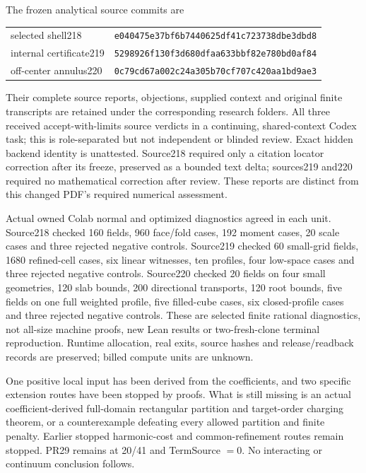 The frozen analytical source commits are
\begin{center}\scriptsize
\begin{tabular}{ll}
selected shell218 & \texttt{e040475e37bf6b7440625df41c723738dbe3dbd8}\\
internal certificate219 & \texttt{5298926f130f3d680dfaa633bbf82e780bd0af84}\\
off-center annulus220 & \texttt{0c79cd67a002c24a305b70cf707c420aa1bd9ae3}
\end{tabular}
\end{center}
Their complete source reports, objections, supplied context and original
finite transcripts are retained under the corresponding research folders.
All three received accept-with-limits source verdicts in a continuing,
shared-context Codex task; this is role-separated but not independent or
blinded review. Exact hidden backend identity is unattested. Source218
required only a citation locator correction after its freeze, preserved
as a bounded text delta; sources219 and220 required no mathematical
correction after review. These reports are distinct from this changed
PDF's required numerical assessment.

Actual owned Colab normal and optimized diagnostics agreed in each unit.
Source218 checked 160 fields, 960 face/fold cases, 192 moment cases,
20 scale cases and three rejected negative controls. Source219 checked
60 small-grid fields, 1680 refined-cell cases, six linear witnesses,
ten profiles, four low-space cases and three rejected negative controls.
Source220 checked 20 fields on four small geometries, 120 slab bounds,
200 directional transports, 120 root bounds, five fields on one full
weighted profile, five filled-cube cases, six closed-profile cases and
three rejected negative controls. These are selected finite rational
diagnostics, not all-size machine proofs, new Lean results or two-fresh-clone
terminal reproduction. Runtime allocation, real exits, source hashes and
release/readback records are preserved; billed compute units are unknown.

One positive local input has been derived from the coefficients, and two
specific extension routes have been stopped by proofs. What is still
missing is an actual coefficient-derived full-domain rectangular partition
and target-order charging theorem, or a counterexample defeating every
allowed partition and finite penalty. Earlier stopped harmonic-cost and
common-refinement routes remain stopped. PR29 remains at 20/41 and
TermSource $=0$. No interacting or continuum conclusion follows.
